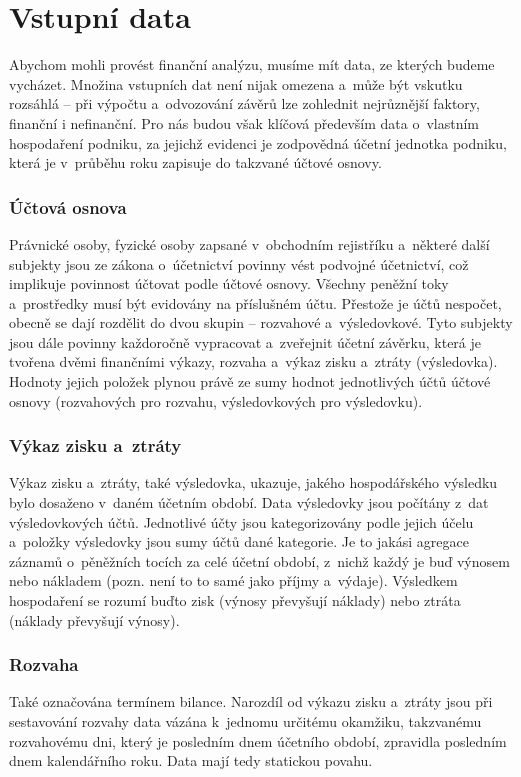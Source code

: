 \section{Vstupní data}
Abychom mohli provést finanční analýzu, musíme mít data, ze kterých budeme vycházet. Množina vstupních dat není nijak omezena a~může být vskutku rozsáhlá -- při výpočtu a~odvozování závěrů lze zohlednit nejrůznější faktory, finanční i nefinanční. Pro nás budou však klíčová především data o~vlastním hospodaření podniku, za jejichž evidenci je zodpovědná účetní jednotka podniku, která je v~průběhu roku zapisuje do takzvané účtové osnovy.

\subsubsection{Účtová osnova}
Právnické osoby, fyzické osoby zapsané v~obchodním rejistříku a~některé další subjekty jsou ze zákona o~účetnictví povinny vést podvojné účetnictví, což implikuje povinnost účtovat podle účtové osnovy.
Všechny peněžní toky a~prostředky musí být evidovány na příslušném účtu. Přestože je účtů nespočet, obecně se dají rozdělit do dvou skupin -- rozvahové a~výsledovkové. Tyto subjekty jsou dále povinny každoročně vypracovat a~zveřejnit účetní závěrku, která je tvořena dvěmi finančními výkazy, rozvaha a~výkaz zisku a~ztráty (výsledovka).
Hodnoty jejich položek plynou právě ze sumy hodnot jednotlivých účtů účtové osnovy (rozvahových pro rozvahu, výsledovkových pro výsledovku).

\subsubsection{Výkaz zisku a~ztráty}
Výkaz zisku a~ztráty, také výsledovka, ukazuje, jakého hospodářského výsledku bylo dosaženo v~daném účetním období. Data výsledovky jsou počítány z~dat výsledovkových účtů. Jednotlivé účty jsou kategorizovány podle jejich účelu a~položky výsledovky jsou sumy účtů dané kategorie. Je to jakási agregace záznamů o~pěněžních tocích za celé účetní období, z~nichž každý je buď výnosem nebo nákladem (pozn. není to to samé jako příjmy a~výdaje). Výsledkem hospodaření se rozumí buďto zisk (výnosy převyšují náklady) nebo ztráta (náklady převyšují výnosy).

\subsubsection{Rozvaha}
Také označována termínem bilance. Narozdíl od výkazu zisku a~ztráty jsou při sestavování rozvahy data vázána k~jednomu určitému okamžiku, takzvanému rozvahovému dni, který je posledním dnem účetního období, zpravidla posledním dnem kalendářního roku. Data mají tedy statickou povahu.


